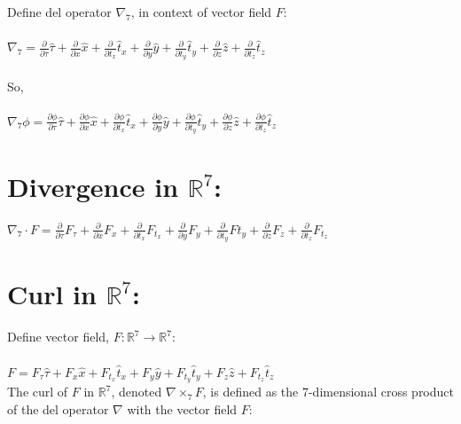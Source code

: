 \documentclass{article}
\begin{document}
\noindent Define del operator $\nabla_7$, in context of vector field $F$:\\
\\
$\nabla_7 = \frac{\partial}{\partial \tau}\hat{\tau} + \frac{\partial}{\partial x}\hat{x} + \frac{\partial}{\partial t_x}\hat{t}_x + \frac{\partial}{\partial y}\hat{y} + \frac{\partial}{\partial t_y}\hat{t}_y + \frac{\partial}{\partial z}\hat{z} + \frac{\partial}{\partial t_z}\hat{t}_z$\\
\\
So,\\
\\
$\nabla_7 \phi = \frac{\partial \phi}{\partial \tau}\hat{\tau} + \frac{\partial \phi}{\partial x}\hat{x} + \frac{\partial \phi}{\partial t_x}\hat{t}_x + \frac{\partial \phi}{\partial y}\hat{y} + \frac{\partial \phi}{\partial t_y}\hat{t}_y + \frac{\partial \phi}{\partial z}\hat{z} + \frac{\partial \phi}{\partial t_z}\hat{t}_z$\\

\section*{Divergence in $\mathbb{R}^7$:}

$\nabla_7 \cdot F = \frac{\partial}{\partial \tau} F_\tau + \frac{\partial}{\partial x} F_x + \frac{\partial}{\partial t_x} F_{t_x} + \frac{\partial}{\partial y} F_y + \frac{\partial}{\partial t_y} F{t_y} + \frac{\partial}{\partial z} F_z + \frac{\partial}{\partial t_z} F_{t_z}$\\

\section*{Curl in $\mathbb{R}^7$:}


\noindent Define vector field, $F: \mathbb{R}^7 \to \mathbb{R}^7$:\\
\\
$F = F_\tau \hat{\tau} + F_x \hat{x} + F_{t_x} \hat{t}_x + F_y \hat{y} + F_{t_y} \hat{t}_y + F_z \hat{z} + F_{t_z} \hat{t}_z$\\




The curl of $F$ in $\mathbb{R}^7$, denoted $\nabla \times_{7} F$, is defined as the 7-dimensional cross product of the del operator $\nabla$ with the vector field $F$:
\end{document}
